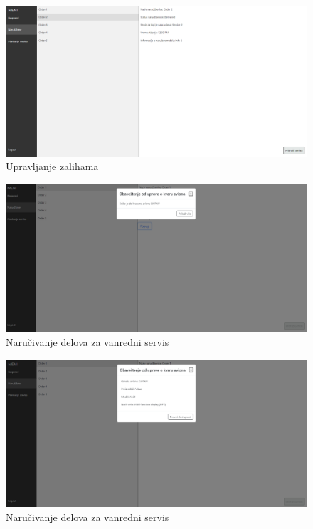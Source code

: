 \documentclass[a4paper]{article}
\begin{document}
\begin{figure}[H]
\begin{center}
\includegraphics[scale=0.3]{UI/narudzbine.png}
\end{center}
\caption{Upravljanje zalihama}
\label{fig:ui_upravljanje_zalihama}
\end{figure}

\begin{figure}[H]
\begin{center}
\includegraphics[scale=0.3]{UI/narucivanje_delova_za_vanredni_servis_1.png}
\end{center}
\caption{Naručivanje delova za vanredni servis}
\label{fig:ui_naručivanje_1}
\end{figure}

\begin{figure}[H]
\begin{center}
\includegraphics[scale=0.35]{UI/narucivanje_delova_za_vanredni_servis_2.png}
\end{center}
\caption{Naručivanje delova za vanredni servis}
\label{fig:ui_naručivanje_2}
\end{figure}
\end{document}

